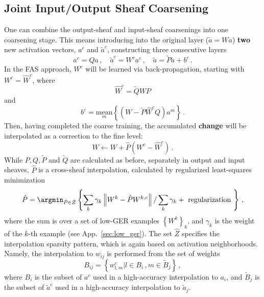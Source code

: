 \documentclass{article} %
\begin{document}
\subsection{Joint Input/Output Sheaf Coarsening}
One can combine the output-sheaf and input-sheaf coarsenings into one coarsening stage. This means introducing into the original layer ($\tilde{a} = Wa$) \textbf{two} new activation vectors, $a^c$ and $\tilde{a}^c$, constructing three consecutive layers
$$
	a^c = Q a\,,\quad \tilde{a}^c = W^c a^c\,,\quad \tilde{a} = \tilde{P} \tilde{a} + b^c\,.
$$
In the FAS approach, $W^c$ will be learned via back-propagation, starting with $W^c = \hat{W}^c$, where
$$ \hat{W}^c = \tilde{Q} W P $$
and
$$ b^c = \underset{m}{\mathrm{mean}}  \left\{ \left( W - \tilde{P} \hat{W}^c Q \right) a^m \right\}\,. $$
Then, having completed the coarse training, the accumulated \textbf{change} will be interpolated as a correction to the fine level:
$$
	W \longleftarrow W + \hat{P} \left( W^c - \hat{W}^c \right)\,.
$$
While $P, Q, \tilde{P}$ and $\tilde{Q}$ are calculated as before, separately in output and input sheaves, $\hat{P}$ is a cross-sheaf interpolation, calculated by regularized least-squares minimization
$$
	\hat{P} = \argmin_{\hat{P} \in \hat{Z}} \left\{ 
		\sum_k \gamma_k \left\| W^k - \hat{P} W^{k,c} \right\| / \sum_k \gamma_k
		+ {\mbox{ regularization }}
	\right\}\,,
$$
where the sum is over a set of low-GER examples $\left\{W^k\right\}_k$, and $\gamma_k$ is the weight of the $k$-th example (see App.~\ref{sec:low_ger}). The set $\hat{Z}$ specifies the interpolation sparsity pattern, which is again based on activation neighborhoods. Namely, the interpolation to $w_{ij}$ is performed from the set of weights
$$
	B_{ij} = \left\{ w^c_{l,m} | l \in B_i\,, m \in \tilde{B}_j \right \}\,,
$$
where $B_i$ is the subset of $a^c$ used in a high-accuracy interpolation to $a_i$, and $\tilde{B}_j$ is the subset of $\tilde{a}^c$ used in a high-accuracy interpolation to $\tilde{a}_j$.

\end{document}
